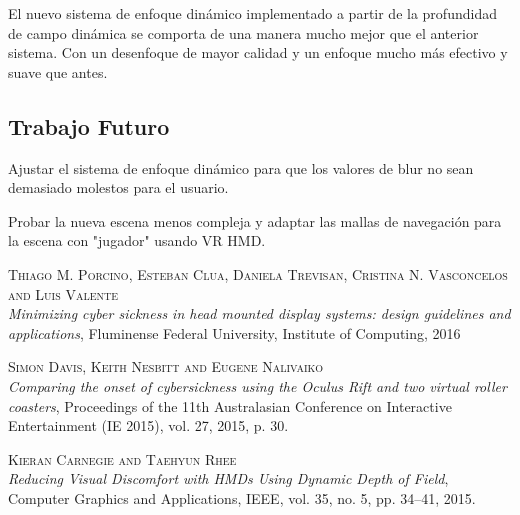 \documentclass[12pt,a4paper]{article}
\begin{document}
El nuevo sistema de enfoque dinámico implementado a partir de la profundidad de campo dinámica se comporta de una manera mucho mejor que el anterior sistema. Con un desenfoque de mayor calidad y un enfoque mucho más efectivo y suave que antes.

\subsection{Trabajo Futuro}

Ajustar el sistema de enfoque dinámico para que los valores de blur no sean demasiado molestos para el usuario.

Probar la nueva escena menos compleja y adaptar las mallas de navegación para la escena con "jugador" usando VR HMD.

\break

\begin{thebibliography}{X}

\textsc{Thiago M. Porcino, Esteban Clua, Daniela Trevisan, Cristina N. Vasconcelos and Luis Valente}\\
\textit{Minimizing cyber sickness in head mounted display systems: design guidelines and applications}, Fluminense Federal University, Institute of Computing, 2016

\textsc{Simon Davis, Keith Nesbitt and Eugene Nalivaiko}\\
\textit{Comparing the onset of cybersickness using the Oculus Rift and two virtual roller coasters}, Proceedings of the 11th Australasian Conference on Interactive Entertainment (IE 2015), vol. 27, 2015, p. 30.

\textsc{Kieran Carnegie and Taehyun Rhee}\\
\textit{Reducing Visual Discomfort with HMDs Using Dynamic Depth of Field}, Computer Graphics and Applications, IEEE, vol. 35, no. 5, pp. 34–41, 2015.

\end{thebibliography}
\end{document}
